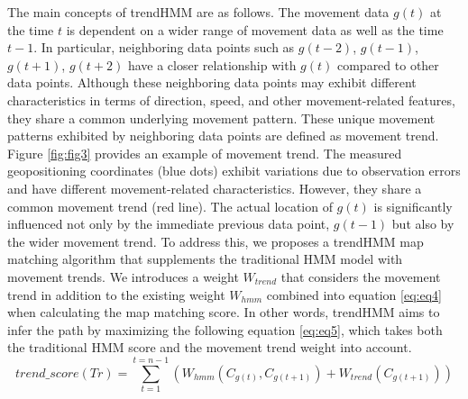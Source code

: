 \documentclass[preprint,12pt]{elsarticle}
\begin{document}
The main concepts of trendHMM are as follows.
The movement data $g(t)$ at the time $t$ is dependent on a wider range of movement data as well as the time $t-1$. In particular, neighboring data points such as $g(t-2)$, $g(t-1)$, $g(t+1)$, $g(t+2)$ have a closer relationship with $g(t)$ compared to other data points. Although these neighboring data points may exhibit different characteristics in terms of direction, speed, and other movement-related features, they share a common underlying movement pattern.
These unique movement patterns exhibited by neighboring data points are defined as movement trend. Figure \ref{fig:fig3} provides an example of movement trend. The measured geopositioning coordinates (blue dots) exhibit variations due to observation errors and have different movement-related characteristics. However, they share a common movement trend (red line). The actual location of $g(t)$ is significantly influenced not only by the immediate previous data point, $g(t-1)$ but also by the wider movement trend.
To address this, we proposes a trendHMM map matching algorithm that supplements the traditional HMM model with movement trends.  We introduces a weight $W_{trend}$ that considers the movement trend in addition to the existing weight $W_{hmm}$ combined into  equation \ref{eq:eq4} when calculating the map matching score. In other words, trendHMM aims to infer the path by maximizing the following equation \ref{eq:eq5}, which takes both the traditional HMM score and the movement trend weight into account.
\begin{equation}\label{eq:eq5}
	trend\_score(Tr)= \sum_{t=1}^{t=n-1}( W_{hmm}(C_{g(t)},C_{g(t+1)}) + W_{trend}(C_{g(t+1)}))
\end{equation}
\end{document}
